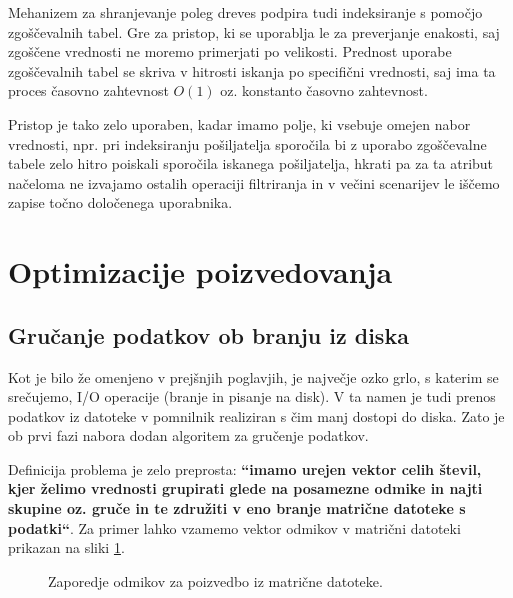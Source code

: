 \documentclass[a4paper,12pt,openright]{book}
\begin{document}
        Mehanizem za shranjevanje poleg dreves podpira tudi indeksiranje s po\-močjo zgoščevalnih tabel. Gre za pristop, ki se uporablja le za preverjanje enakosti, saj zgoščene vrednosti ne moremo primerjati po velikosti.
        Prednost uporabe zgoščevalnih tabel se skriva v hitrosti iskanja po specifični vrednosti, saj ima ta proces časovno zahtevnost $O(1)$ oz. konstanto časovno zahtevnost.
        
        Pristop je tako zelo uporaben, kadar imamo polje, ki vsebuje omejen nabor vrednosti, npr. pri indeksiranju pošiljatelja sporočila bi z uporabo zgoščevalne tabele zelo hitro poiskali sporočila iskanega pošiljatelja, hkrati pa za ta atribut načeloma ne izvajamo ostalih operaciji filtriranja in v večini scenarijev le iščemo zapise točno določenega uporabnika.

    \section{Optimizacije poizvedovanja}
        
        \subsection{Gručanje podatkov ob branju iz diska}
        
        Kot je bilo že omenjeno v prejšnjih poglavjih, je največje ozko grlo, s katerim se srečujemo, I/O operacije (branje in pisanje na disk). V ta namen je tudi prenos podatkov iz datoteke v pomnilnik realiziran s čim manj dostopi do diska. Zato je ob prvi fazi nabora dodan algoritem za gručenje podatkov.

        Definicija problema je zelo preprosta: \textbf{``imamo urejen vektor celih števil, kjer želimo vrednosti grupirati glede na posamezne odmike in najti skupine oz. gruče in te združiti v eno branje matrične datoteke s podatki``}. Za primer lahko vzamemo vektor odmikov v matrični datoteki prikazan na sliki \ref{clustering_no_color}.

\hfill \break
\begin{figure}[h]
\begin{center}
\caption{Zaporedje odmikov za poizvedbo iz matrične datoteke.}
\label{clustering_no_color}
\end{center}
\end{figure}
\end{document}
